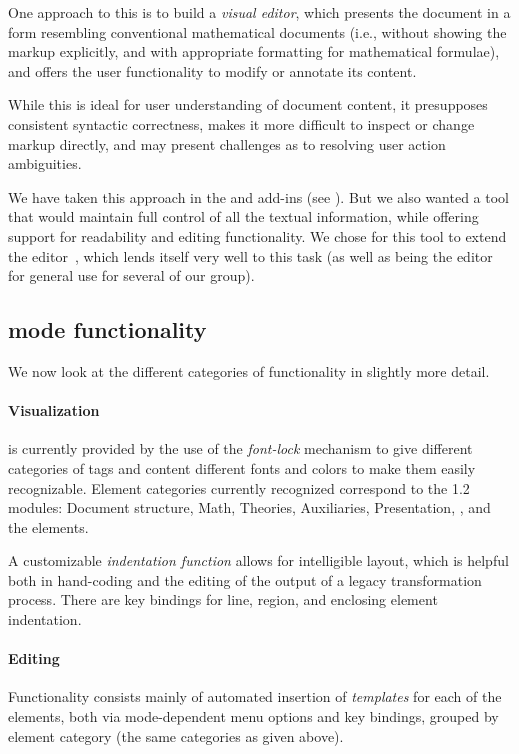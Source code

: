One approach to this is to build a {\emph{visual {\omdoc} editor}}, which presents the
document in a form resembling conventional mathematical documents (i.e., without showing
the markup explicitly, and with appropriate formatting for mathematical formulae), and
offers the user functionality to modify or annotate its content.

While this is ideal for user understanding of document content, it presupposes
consistent syntactic correctness, makes it more difficult to inspect or change
markup directly, and may present challenges as to resolving user action
ambiguities.

We have taken this approach in the {\cpoint} and {\mathematica} add-ins (see
{}). But we also wanted a tool that would maintain full
control of all the textual information, while offering support for readability and editing
functionality.  We chose for this tool to extend the {\emacs} editor~\cite{Stallman:em02},
which lends itself very well to this task (as well as being the editor for general use for
several of our group).

\subsection{{\omdoc} mode functionality}

We now look at the different categories of
functionality in slightly more detail.

\paragraph{Visualization}
is currently provided by the use of the {\emacs} {\emph{font-lock}} mechanism to give
different categories of tags and content different fonts and colors to make them easily
recognizable.  Element categories currently recognized correspond to the {\omdoc} 1.2
modules: Document structure, Math, Theories, Auxiliaries, Presentation, {\openmath}, and
the {} elements.

A customizable {\emph{indentation function}} allows for intelligible layout, which is
helpful both in hand-coding and the editing of the output of a legacy transformation
process.  There are key bindings for line, region, and enclosing element indentation.

\paragraph{Editing}
Functionality consists mainly of automated insertion of {\emph{templates}} for each of the
{\omdoc} elements, both via mode-dependent menu options and key bindings, grouped by
element category (the same categories as given above).

